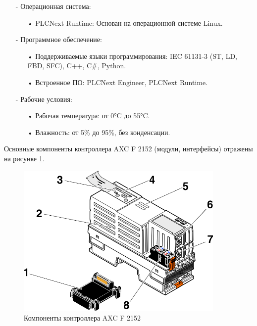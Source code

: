 \begin{itemize}
    \item[-] Операционная система:
        \begin{itemize}
            \item[•] PLCNext Runtime: Основан на операционной системе Linux.
        \end{itemize}

    \item[-] Программное обеспечение:
        \begin{itemize}
            \item[•] Поддерживаемые языки программирования: IEC 61131-3 (ST, LD, FBD, SFC), C++, C\#, Python.
            \item[•] Встроенное ПО: PLCNext Engineer, PLCNext Runtime.
        \end{itemize}

    \item[-] Рабочие условия:
        \begin{itemize}
            \item[•] Рабочая температура: от 0°C до 55°C.
            \item[•] Влажность: от 5\% до 95\%, без конденсации.
        \end{itemize}

\end{itemize}

Основные компоненты контроллера AXC F 2152 (модули, интерфейсы) отражены на рисунке \ref{fig:PLCComplect}. 

\begin{figure}[H]
    \centering
    \includegraphics[width=0.9\textwidth]{images/chapter_4/pclnext_complect.png}
    \caption{Компоненты контроллера AXC F 2152}
    \label{fig:PLCComplect}
\end{figure}

